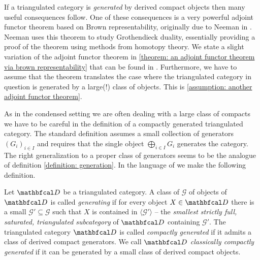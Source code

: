 If a triangulated category is \emph{generated} by derived compact objects then many useful consequences follow. One of these consequences is a very powerful adjoint functor theorem based on Brown representability, originally due to Neeman in \cite{neeman}. Neeman uses this theorem to study Grothendieck duality, essentially providing a proof of the theorem using methods from homotopy theory. We state a slight variation of the adjoint functor theorem in \ref{theorem: an adjoint functor theorem via brown representability} that can be found in \cite[\href{https://stacks.math.columbia.edu/tag/0A8E}{Tag 0A8E}]{stacks-project}. Furthermore, we have to assume that the theorem translates the case where the triangulated category in question is generated by a large(!) class of objects. This is \assumptionPreWord \ref{assumption: another adjoint functor theorem}. 

As in the condensed setting we are often dealing with a large class of compacts we have to be careful in the definition of a compactly generated triangulated category. The standard definition assumes a small collection of generators $(G_i)_{i\in I}$ and requires that the single object $\bigoplus_{i\in I} G_i$ generates the category. The right generalization to a proper class of generators seems to be the analogue of definition \ref{definition: generation}. In the language of \cite[\href{https://stacks.math.columbia.edu/tag/09SI}{Tag 09SI}]{stacks-project} we make the following definition.
\begin{definition}
	\label{definition: compactly generated triangulated categories}
	
	Let $\category{D}$ be a triangulated category. A class of $\mathcal G$ of objects of $\category{D}$ is called \emph{generating} if for every object $X\in\category{D}$ there is a small $\mathcal{G'}\subseteq \mathcal G$ such that $X$ is contained in $\langle \mathcal{G'}\rangle$ -- the \emph{smallest strictly full, saturated, triangulated subcategory} of $\category{D}$ containing $\mathcal{G'}$. The triangulated category $\category{D}$ is called \emph{compactly generated} if it admits a class of derived compact generators. We call $\category{D}$ \emph{classically compactly generated} if it can be generated by a small class of derived compact objects.
\end{definition}

